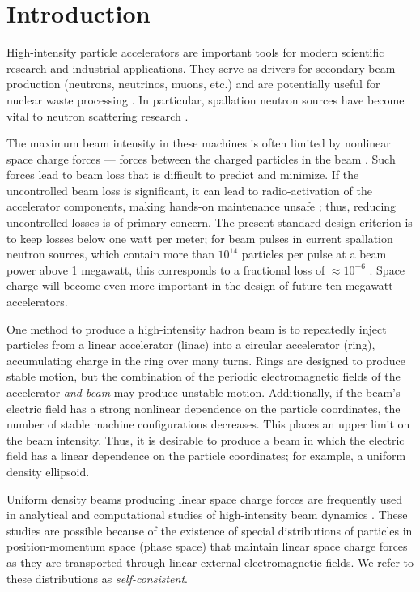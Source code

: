 \chapter{Introduction}\label{chap-1}

High-intensity particle accelerators are important tools for modern scientific research and industrial applications. They serve as drivers for secondary beam production (neutrons, neutrinos, muons, etc.) \cite{Geer2009} and are potentially useful for nuclear waste processing \cite{Yee-Rendon2021}. In particular, spallation neutron sources have become vital to neutron scattering research \cite{Garoby2017}.

The maximum beam intensity in these machines is often limited by nonlinear space charge forces — forces between the charged particles in the beam \cite{Hofmann2017Book}. Such forces lead to beam loss that is difficult to predict and minimize. If the uncontrolled beam loss is significant, it can lead to radio-activation of the accelerator components, making hands-on maintenance unsafe \cite{Bungau2014}; thus, reducing uncontrolled losses is of primary concern. The present standard design criterion is to keep losses below one watt per meter; for beam pulses in current spallation neutron sources, which contain more than $10^{14}$ particles per pulse at a beam power above 1 megawatt, this corresponds to a fractional loss of $\approx 10^{-6}$ \cite{Henderson2014}. Space charge will become even more important in the design of future ten-megawatt accelerators. 
 
One method to produce a high-intensity hadron beam is to repeatedly inject particles from a linear accelerator (linac) into a circular accelerator (ring), accumulating charge in the ring over many turns. Rings are designed to produce stable motion, but the combination of the periodic electromagnetic fields of the accelerator \textit{and beam} may produce unstable motion. Additionally, if the beam's electric field has a strong nonlinear dependence on the particle coordinates, the number of stable machine configurations decreases. This places an upper limit on the beam intensity. Thus, it is desirable to produce a beam in which the electric field has a linear dependence on the particle coordinates; for example, a uniform density ellipsoid.

Uniform density beams producing linear space charge forces are frequently used in analytical and computational studies of high-intensity beam dynamics \cite{Lund2004}. These studies are possible because of the existence of special distributions of particles in position-momentum space (phase space) that maintain linear space charge forces as they are transported through linear external electromagnetic fields. We refer to these distributions as \textit{self-consistent}.

